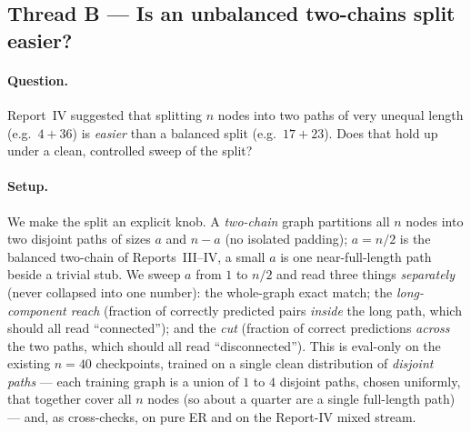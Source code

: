 \documentclass[11pt,a4paper]{article}
\begin{document}
\subsection{Thread B --- Is an unbalanced two-chains split easier?}
\label{sec:res-asym-chains}
\paragraph{Question.} Report~IV suggested that splitting $n$ nodes into two paths of very unequal
length (e.g.\ $4{+}36$) is \emph{easier} than a balanced split (e.g.\ $17{+}23$). Does that hold up
under a clean, controlled sweep of the split?

\paragraph{Setup.} We make the split an explicit knob. A \emph{two-chain} graph partitions all $n$
nodes into two disjoint paths of sizes $a$ and $n-a$ (no isolated padding); $a=n/2$ is the balanced
two-chain of Reports~III--IV, a small $a$ is one near-full-length path beside a trivial stub. We
sweep $a$ from $1$ to $n/2$ and read three things \emph{separately} (never collapsed into one
number): the whole-graph exact match; the \emph{long-component reach} (fraction of correctly
predicted pairs \emph{inside} the long path, which should all read ``connected''); and the
\emph{cut} (fraction of correct predictions \emph{across} the two paths, which should all read
``disconnected''). This is eval-only on the existing $n=40$ checkpoints, trained on a single clean
distribution of \emph{disjoint paths} --- each training graph is a union of $1$ to $4$ disjoint paths,
chosen uniformly, that together cover all $n$ nodes (so about a quarter are a single full-length
path) --- and, as cross-checks, on pure ER and on the Report-IV mixed stream.
\end{document}
